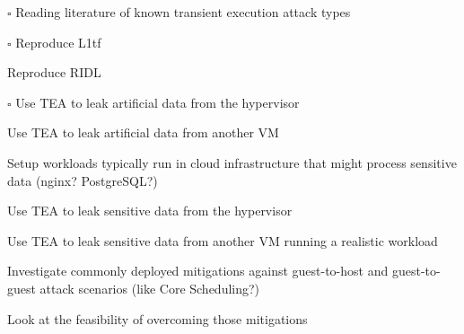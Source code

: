 \documentclass[draft, a4paper, 11pt]{article}
\newcommand{\done}{\rlap{\raisebox{0.3ex}{\hspace{0.4ex}\scriptsize \ding{51}}}$\square$}
\begin{document}
\begin{todolist}
  \item[\done] Reading literature of known transient execution attack types
  \item[\done] Reproduce L1tf
  \item Reproduce RIDL
  \item[\done] Use TEA to leak artificial data from the hypervisor
  \item Use TEA to leak artificial data from another VM
  \item Setup workloads typically run in cloud infrastructure that might process sensitive data (nginx? PostgreSQL?)
  \item Use TEA to leak sensitive data from the hypervisor
  \item Use TEA to leak sensitive data from another VM running a realistic workload
  \item Investigate commonly deployed mitigations against guest-to-host and guest-to-guest attack scenarios (like Core Scheduling?)
  \item Look at the feasibility of overcoming those mitigations
\end{todolist}

\printbibliography
\end{document}
